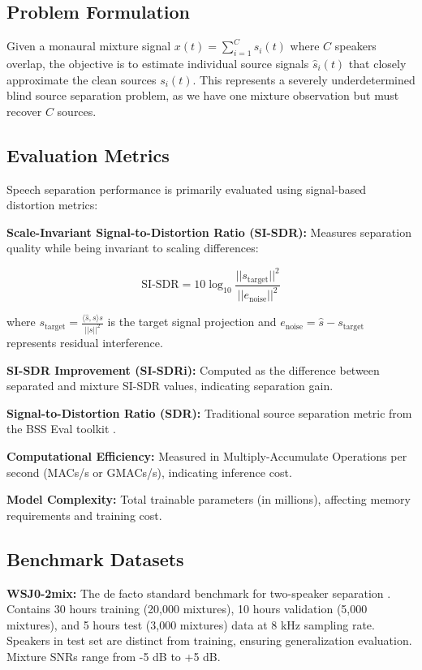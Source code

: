 \documentclass[conference]{IEEEtran}
\begin{document}
\subsection{Problem Formulation}

Given a monaural mixture signal $x(t) = \sum_{i=1}^{C} s_i(t)$ where $C$ speakers overlap, the objective is to estimate individual source signals $\hat{s}_i(t)$ that closely approximate the clean sources $s_i(t)$. This represents a severely underdetermined blind source separation problem, as we have one mixture observation but must recover $C$ sources.

\subsection{Evaluation Metrics}

Speech separation performance is primarily evaluated using signal-based distortion metrics:

\textbf{Scale-Invariant Signal-to-Distortion Ratio (SI-SDR):} Measures separation quality while being invariant to scaling differences:

\begin{equation}
\text{SI-SDR} = 10 \log_{10} \frac{||s_{\text{target}}||^2}{||e_{\text{noise}}||^2}
\end{equation}

where $s_{\text{target}} = \frac{\langle \hat{s}, s \rangle s}{||s||^2}$ is the target signal projection and $e_{\text{noise}} = \hat{s} - s_{\text{target}}$ represents residual interference.

\textbf{SI-SDR Improvement (SI-SDRi):} Computed as the difference between separated and mixture SI-SDR values, indicating separation gain.

\textbf{Signal-to-Distortion Ratio (SDR):} Traditional source separation metric from the BSS Eval toolkit \cite{vincent2006performance}.

\textbf{Computational Efficiency:} Measured in Multiply-Accumulate Operations per second (MACs/s or GMACs/s), indicating inference cost.

\textbf{Model Complexity:} Total trainable parameters (in millions), affecting memory requirements and training cost.

\subsection{Benchmark Datasets}

\textbf{WSJ0-2mix:} The de facto standard benchmark for two-speaker separation \cite{hershey2016deep}. Contains 30 hours training (20,000 mixtures), 10 hours validation (5,000 mixtures), and 5 hours test (3,000 mixtures) data at 8 kHz sampling rate. Speakers in test set are distinct from training, ensuring generalization evaluation. Mixture SNRs range from -5 dB to +5 dB.
\end{document}
